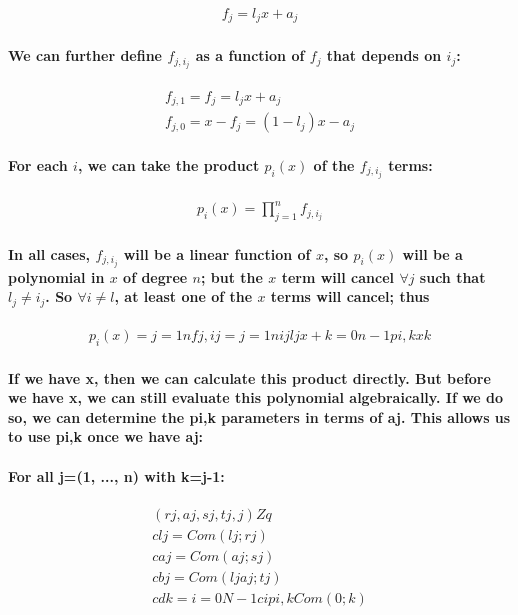 \documentclass{article}
\begin{document}
\begin{eqnarray}
  f_j = l_j x + a_j
\end{eqnarray}

\paragraph{We can further define $f_{j, i_j}$ as a function of $f_j$ that depends on $i_j$:}

\begin{eqnarray}
  f_{j,1} = f_j = l_j x + a_j\\
  f_{j,0} = x - f_j = (1 - l_j) x - a_j
\end{eqnarray}

\paragraph{For each $i$, we can take the product $p_i(x)$ of the $f_{j, i_j}$ terms:}

\begin{eqnarray}
  p_i(x) = \prod_{j=1}^{n} f_{j, i_j}
\end{eqnarray}

\paragraph{In all cases, $f_{j, i_j}$ will be a linear function of $x$, so $p_i(x)$ will be a polynomial in $x$ of degree $n$; but the $x$ term will cancel $\forall j$ such that $l_j \ne i_j$.  So $\forall i \ne l$, at least one of the $x$ terms will cancel; thus}

\begin{eqnarray}
  p_i(x) = j=1nfj,ij=j=1nijljx+ k=0n-1pi,k xk
\end{eqnarray}

\paragraph{If we have x, then we can calculate this product directly.  But before we have x, we can still evaluate this polynomial algebraically.  If we do so, we can determine the pi,k parameters in terms of aj.  This allows us to use pi,k once we have aj:}

\paragraph{For all j=(1, ..., n) with k=j-1:}

\begin{eqnarray}
  (rj,aj,sj,tj,j) Zq\\
  clj=Com(lj;rj)\\
  caj=Com(aj;sj)\\
  cbj=Com(ljaj;tj)\\
  cdk=i=0N-1cipi,k Com(0;k)
\end{eqnarray}
\end{document}
